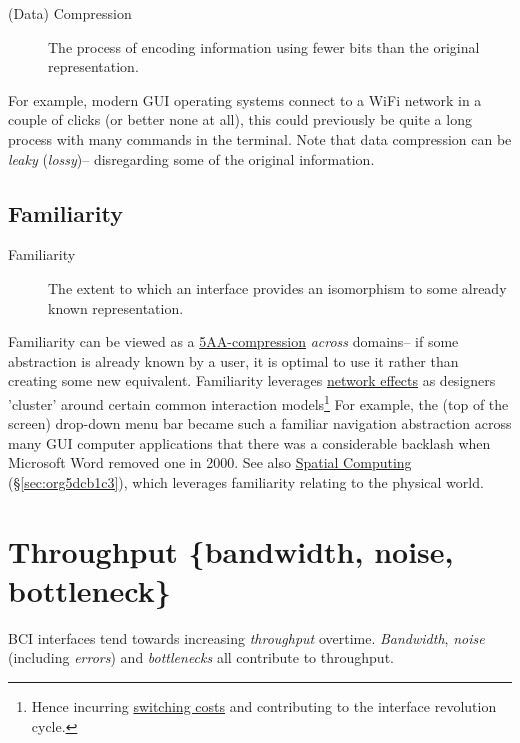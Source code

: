 \documentclass[logo,bsc,singlespacing,parskip]{infthesis}
\begin{document}
\begin{mdframed}
\begin{description}
\item[{(Data) Compression\label{compression}}] The process of encoding information using fewer bits than the original representation.
\end{description}
\end{mdframed}

For example, modern GUI operating systems connect to a WiFi network in a couple of clicks (or better none at all), this could previously be quite a long process with many commands in the terminal.
Note that data compression can be \emph{leaky} (\emph{lossy})-- disregarding some of the original information.

\subsection{Familiarity}
\label{sec:org24a8348}
\medskip
\begin{mdframed}
\begin{description}
\item[{Familiarity\label{familiarity}}] The extent to which an interface provides an isomorphism to some already known representation.
\end{description}
\end{mdframed}

Familiarity can be viewed as a \hyperref[compression]{5AA-compression} \emph{across} domains-- if some abstraction is already known by a user, it is optimal to use it rather than creating some new equivalent.
Familiarity leverages \hyperref[network effects]{network effects} as designers 'cluster' around certain common interaction models\footnote{Hence incurring \hyperref[switching costs]{switching costs} and contributing to the interface revolution cycle.}
For example, the (top of the screen) drop-down menu bar became such a familiar navigation abstraction across many GUI computer applications that there was a considerable backlash when Microsoft Word removed one in 2000.
See also \hyperref[sec:org5dcb1c3]{Spatial Computing} (\S \ref{sec:org5dcb1c3}), which leverages familiarity relating to the physical world.

\section{Throughput \{bandwidth, noise, bottleneck\}}
\label{sec:orgce39a5d}
BCI interfaces tend towards increasing \emph{throughput} overtime. \emph{Bandwidth}, \emph{noise} (including \emph{errors}) and \emph{bottlenecks} all contribute to throughput.
\end{document}
